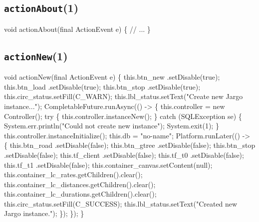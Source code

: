 \subsection{\texttt{actionAbout}(1)}
\nwenddocs{}\endmoddef{}
void actionAbout(final ActionEvent e) \{
  // ...
\}
\eatline
{}\nwendcode{}\nwdocspar
\subsection{\texttt{actionNew}(1)}
\nwenddocs{}\endmoddef{}
void actionNew(final ActionEvent e) \{
  this.btn_new      .setDisable(true);
  this.btn_load     .setDisable(true);
  this.btn_stop     .setDisable(true);
  this.circ_status.setFill(C_WARN);
  this.lbl_status.setText("Create new Jargo instance...");
  CompletableFuture.runAsync(() -> \{
    this.controller = new Controller();
    try \{
      this.controller.instanceNew();
    \} catch (SQLException se) \{
      System.err.println("Could not create new instance");
      System.exit(1);
    \}
    this.controller.instanceInitialize();
    this.db = "no-name";
    Platform.runLater(() -> \{
      this.btn_road     .setDisable(false);
      this.btn_gtree    .setDisable(false);
      this.btn_stop     .setDisable(false);
      this.tf_client     .setDisable(false);
      this.tf_t0        .setDisable(false);
      this.tf_t1        .setDisable(false);
      this.container_canvas.setContent(null);
      this.container_lc_rates.getChildren().clear();
      this.container_lc_distances.getChildren().clear();
      this.container_lc_durations.getChildren().clear();
      this.circ_status.setFill(C_SUCCESS);
      this.lbl_status.setText("Created new Jargo instance.");
    \});
  \});
\}
\eatline
{}\nwendcode{}\nwdocspar
